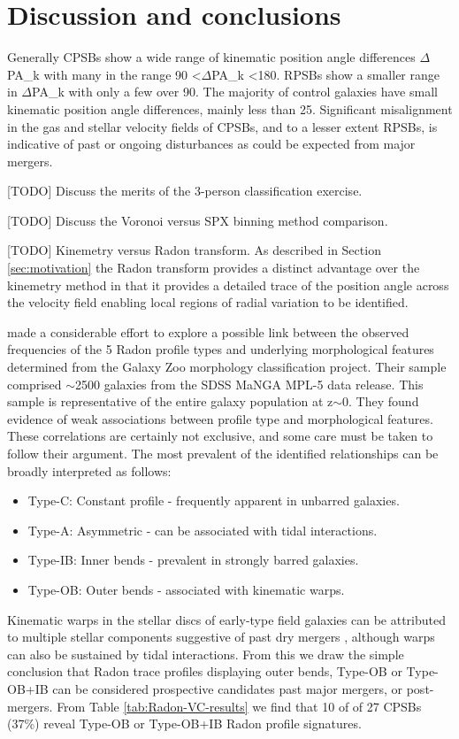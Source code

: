 \section{Discussion and conclusions}
\label{sec:discussion}

Generally CPSBs show a wide range of kinematic position angle differences $\Delta$PA\_k with many in the range 90 \textless $\Delta$PA\_k \textless 180\textdegree. RPSBs show a smaller range in $\Delta$PA\_k with only a few over 90\textdegree. The majority of control galaxies have small kinematic position angle differences, mainly less than 25\textdegree. Significant misalignment in the gas and stellar velocity fields of CPSBs, and to a lesser extent RPSBs, is indicative of past or ongoing disturbances as could be expected from major mergers.

[TODO] Discuss the merits of the 3-person classification exercise.

[TODO] Discuss the Voronoi versus SPX binning method comparison.

[TODO] Kinemetry versus Radon transform. As described in Section \ref{sec:motivation} the Radon transform provides a distinct advantage over the kinemetry method in that it provides a detailed trace of the position angle across the velocity field enabling local regions of radial variation to be identified. 

\cite{2018MNRAS.480.2217S} made a considerable effort to explore a possible link between the observed frequencies of the 5 Radon profile types and underlying morphological features determined from the Galaxy Zoo morphology classification project. Their sample comprised $\sim$2500 galaxies from the SDSS MaNGA MPL-5 data release. This sample is representative of the entire galaxy population at z$\sim$0. They found evidence of weak associations between profile type and morphological features. These correlations are certainly not exclusive, and some care must be taken to follow their argument. The most prevalent of the identified relationships can be broadly interpreted as follows:
\begin{itemize}
    \item Type-C: Constant profile - frequently apparent in unbarred galaxies.
    \item Type-A: Asymmetric - can be associated with tidal interactions.
    \item Type-IB: Inner bends - prevalent in strongly barred galaxies.
    \item Type-OB: Outer bends - associated with kinematic warps.
\end{itemize}
Kinematic warps in the stellar discs of early-type field galaxies can be attributed to multiple stellar components suggestive of past dry mergers \citep{2005AJ....130.2647V}, although warps can also be sustained by tidal interactions.
From this we draw the simple conclusion that Radon trace profiles displaying outer bends, Type-OB or Type-OB+IB can be considered prospective candidates past major mergers, or post-mergers. From Table \ref{tab:Radon-VC-results} we find that 10 of of 27 CPSBs (37\%) reveal Type-OB or Type-OB+IB Radon profile signatures.   

